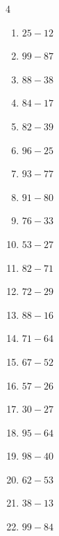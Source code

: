 \begin{multicols}{4}
\begin{enumerate}
  \item $25-12$
        \phantom{$=13$}

  \item $99-87$
        \phantom{$=12$}

  \item $88-38$
        \phantom{$=50$}

  \item $84-17$
        \phantom{$=67$}

  \item $82-39$
        \phantom{$=43$}

\columnbreak %

  \item $96-25$
        \phantom{$=71$}

  \item $93-77$
        \phantom{$=16$}

  \item $91-80$
        \phantom{$=11$}

  \item $76-33$
        \phantom{$=43$}

  \item $53-27$
        \phantom{$=26$}

  \item $82-71$
        \phantom{$=11$}

  \item $72-29$
        \phantom{$=43$}

  \item $88-16$
        \phantom{$=72$}

  \item $71-64$
        \phantom{$=7$}

  \item $67-52$
        \phantom{$=15$}

  \item $57-26$
        \phantom{$=31$}

  \item $30-27$
        \phantom{$=3$}

  \item $95-64$
        \phantom{$=31$}

  \item $98-40$
        \phantom{$=58$}

  \item $62-53$
        \phantom{$=9$}

  \item $38-13$
        \phantom{$=25$}

  \item $99-84$
        \phantom{$=15$}


\end{enumerate}
\end{multicols}
